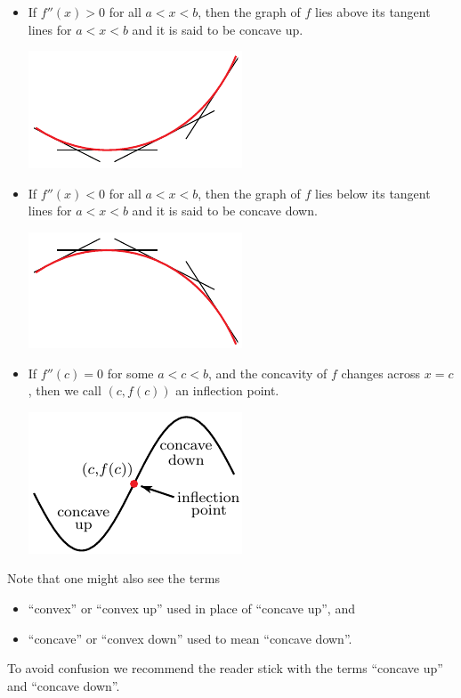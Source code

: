 \begin{defn}
\begin{itemize}
\item If $f''(x)>0$ for all $a<x<b$, then the graph of $f$ lies above its tangent lines
for $a<x<b$ and it is said to be concave up.
\begin{efig}
\begin{center}
   \includegraphics{convexUpBB}
\end{center}
\end{efig}
\item If $f''(x)<0$ for all $a<x<b$, then the graph of $f$ lies below its tangent lines
for $a<x<b$ and it is said to be concave down.
\begin{efig}
\begin{center}
   \includegraphics{convexDownBB}
\end{center}
\end{efig}
\item If $f''(c)=0$ for some $a<c<b$, and the concavity of $f$ changes across $x=c$, then
we call $(c,f(c))$ an inflection point.
\begin{efig}
\begin{center}
   \includegraphics{inflection}
\end{center}
\end{efig}
\end{itemize}
\end{defn}
Note that one might also see the terms
\begin{itemize}
 \item ``convex'' or ``convex up'' used in place of ``concave up'', and
 \item ``concave'' or ``convex down'' used to mean ``concave down''.
\end{itemize}
To avoid confusion we recommend the reader stick with the terms ``concave up'' and
``concave down''.


